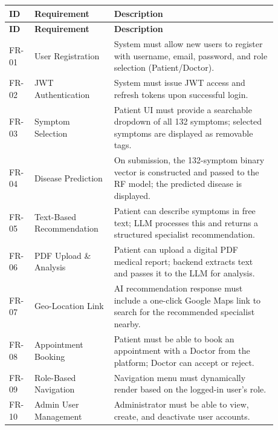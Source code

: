 \begin{longtable}{|p{0.08\linewidth}|p{0.25\linewidth}|p{0.55\linewidth}|}
\hline
\textbf{ID} & \textbf{Requirement} & \textbf{Description} \\
\hline
\endfirsthead
\hline
\textbf{ID} & \textbf{Requirement} & \textbf{Description} \\
\hline
\endhead
FR-01 & User Registration & System must allow new users to register with username, email, password, and role selection (Patient/Doctor). \\
\hline
FR-02 & JWT Authentication & System must issue JWT access and refresh tokens upon successful login. \\
\hline
FR-03 & Symptom Selection & Patient UI must provide a searchable dropdown of all 132 symptoms; selected symptoms are displayed as removable tags. \\
\hline
FR-04 & Disease Prediction & On submission, the 132-symptom binary vector is constructed and passed to the RF model; the predicted disease is displayed. \\
\hline
FR-05 & Text-Based Recommendation & Patient can describe symptoms in free text; LLM processes this and returns a structured specialist recommendation. \\
\hline
FR-06 & PDF Upload \& Analysis & Patient can upload a digital PDF medical report; backend extracts text and passes it to the LLM for analysis. \\
\hline
FR-07 & Geo-Location Link & AI recommendation response must include a one-click Google Maps link to search for the recommended specialist nearby. \\
\hline
FR-08 & Appointment Booking & Patient must be able to book an appointment with a Doctor from the platform; Doctor can accept or reject. \\
\hline
FR-09 & Role-Based Navigation & Navigation menu must dynamically render based on the logged-in user's role. \\
\hline
FR-10 & Admin User Management & Administrator must be able to view, create, and deactivate user accounts. \\
\hline
\end{longtable}

